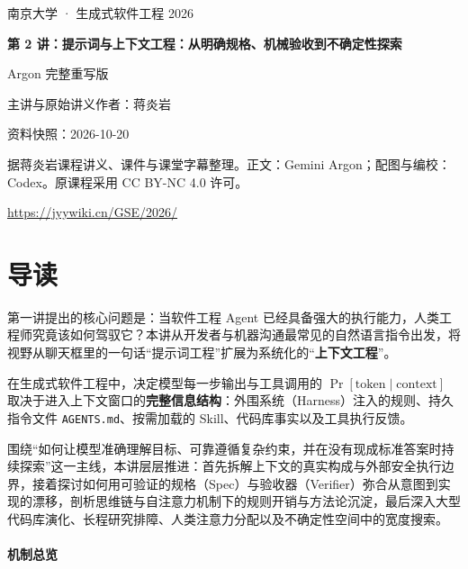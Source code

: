 \documentclass[UTF8,a4paper,11pt,fontset=fandol]{ctexart}
\begin{document}
\begin{titlepage}\centering\vspace*{25mm}

{\Large 南京大学 · 生成式软件工程 2026\par}\vspace{12mm}

{\Huge\bfseries 第 2 讲：提示词与上下文工程：从明确规格、机械验收到不确定性探索\par}\vspace{10mm}

{\Large Argon 完整重写版\par}\vspace{10mm}

主讲与原始讲义作者：蒋炎岩\par

资料快照：2026-10-20\par\vfill

据蒋炎岩课程讲义、课件与课堂字幕整理。正文：Gemini Argon；配图与编校：Codex。原课程采用 CC BY-NC 4.0 许可。

\vspace{8mm}\url{https://jyywiki.cn/GSE/2026/}

\end{titlepage}

\tableofcontents\clearpage

\section*{导读}

第一讲提出的核心问题是：当软件工程 Agent 已经具备强大的执行能力，人类工程师究竟该如何驾驭它？本讲从开发者与机器沟通最常见的自然语言指令出发，将视野从聊天框里的一句话“提示词工程”扩展为系统化的“\textbf{上下文工程}”。

在生成式软件工程中，决定模型每一步输出与工具调用的 \(\Pr[\text{token}\mid\text{context}]\) 取决于进入上下文窗口的\textbf{完整信息结构}：外围系统（Harness）注入的规则、持久指令文件 \texttt{AGENTS.md}、按需加载的 Skill、代码库事实以及工具执行反馈。

围绕“如何让模型准确理解目标、可靠遵循复杂约束，并在没有现成标准答案时持续探索”这一主线，本讲层层推进：首先拆解上下文的真实构成与外部安全执行边界，接着探讨如何用可验证的规格（Spec）与验收器（Verifier）弥合从意图到实现的漂移，剖析思维链与自注意力机制下的规则开销与方法论沉淀，最后深入大型代码库演化、长程研究排障、人类注意力分配以及不确定性空间中的宽度搜索。

\paragraph{机制总览}
\end{document}
